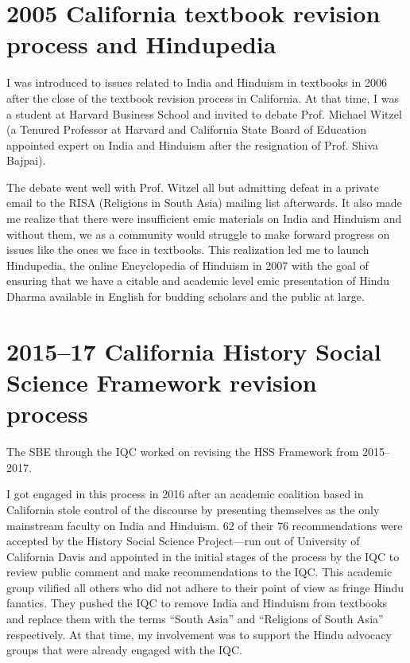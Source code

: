 \section*{2005 California textbook revision process and Hindupedia}

I was introduced to issues related to India and Hinduism in textbooks in 2006 after the close of the textbook revision process in California. At that time, I was a student at Harvard Business School and invited to debate Prof. Michael Witzel (a Tenured Professor at Harvard and California State Board of Education appointed expert on India and Hinduism after the resignation of Prof. Shiva Bajpai).

The debate went well with Prof. Witzel all but admitting defeat in a private email to the RISA (Religions in South Asia) mailing list afterwards. It also made me realize that there were insufficient emic materials on India and Hinduism and without them, we as a community would struggle to make forward progress on issues like the ones we face in textbooks. This realization led me to launch Hindupedia, the online Encyclopedia of Hinduism in 2007 with the goal of ensuring that we have a citable and academic level emic presentation of Hindu Dharma available in English for budding scholars and the public at large. 

\section*{2015--17 California History Social Science Framework revision process}

The SBE through the IQC worked on revising the HSS Framework from 2015--2017.

I got engaged in this process in 2016 after an academic coalition based in California stole control of the discourse by presenting themselves as the only mainstream faculty on India and Hinduism. 62 of their 76 recommendations were accepted by the History Social Science Project—run out of University of California Davis and appointed in the initial stages of the process by the IQC to review public comment and make recommendations to the IQC. This academic group vilified all others who did not adhere to their point of view as fringe Hindu fanatics. They pushed the IQC to remove India and Hinduism from textbooks and replace them with the terms “South Asia” and “Religions of South Asia” respectively. At that time, my involvement was to support the Hindu advocacy groups that were already engaged with the IQC. 

